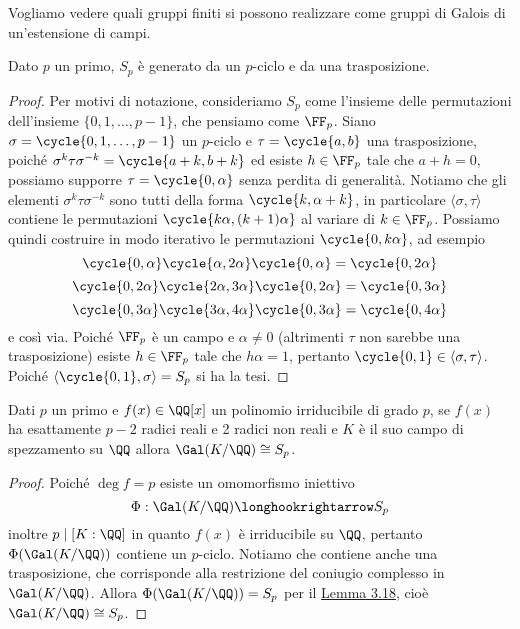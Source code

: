 \documentclass[11pt]{scrartcl}
\begin{document}
	Vogliamo vedere quali gruppi finiti si possono realizzare come gruppi di 
	Galois di un'estensione di campi. 
	
	\begin{lemma}
		\label{lemma3.18}
		Dato $p$ un primo, $S_p$ è generato da un $p$-ciclo e da una trasposizione.
	\end{lemma}
	
	\begin{proof}
		Per motivi di notazione, consideriamo $S_p$ come l'insieme delle permutazioni
		dell'insieme $\{0, 1, \ldots, p - 1\}$, che pensiamo come $\FF_p$. Siano
		$\sigma = \cycle{0, 1, \ldots, p - 1}$ un $p$-ciclo e $\tau = \cycle{a, b}$
		una trasposizione, poiché $\sigma^k\tau\sigma^{-k} = \cycle{a + k, b + k}$
		ed esiste $h \in \FF_p$ tale che $a + h = 0$, possiamo supporre
		$\tau = \cycle{0, \alpha}$ senza perdita di generalità. Notiamo che gli 
		elementi $\sigma^k\tau\sigma^{-k}$ sono tutti della forma $\cycle{k, \alpha + k}$,
		in particolare $\langle\sigma, \tau\rangle$ contiene le permutazioni 
		$\cycle{k\alpha, (k + 1)\alpha}$ al variare di $k \in \FF_p$. Possiamo
		quindi costruire in modo iterativo le permutazioni $\cycle{0, k\alpha}$,
		ad esempio
		\[
		\cycle{0, \alpha}\cycle{\alpha, 2\alpha}\cycle{0, \alpha} = \cycle{0, 2\alpha}
		\]
		\[
		\cycle{0, 2\alpha}\cycle{2\alpha, 3\alpha}\cycle{0, 2\alpha} = \cycle{0, 3\alpha}
		\]
		\[
		\cycle{0, 3\alpha}\cycle{3\alpha, 4\alpha}\cycle{0, 3\alpha} = \cycle{0, 4\alpha}
		\]
		e così via. Poiché $\FF_p$ è un campo e $\alpha \neq 0$ (altrimenti $\tau$ 
		non sarebbe una trasposizione) esiste $h \in \FF_p$ tale che $h\alpha = 1$,
		pertanto $\cycle{0, 1} \in \langle\sigma, \tau\rangle$. Poiché 
		$\langle\cycle{0, 1}, \sigma\rangle = S_p$ si ha la tesi.
	\end{proof}
	
	\begin{lemma}
		\label{lemma3.19}
		Dati $p$ un primo e $f(x) \in \QQ[x]$ un polinomio irriducibile di grado
		$p$, se $f(x)$ ha esattamente $p - 2$ radici reali e 2 radici non reali
		e $K$ è il suo campo di spezzamento su $\QQ$ allora $\Gal(K/\QQ) \cong S_p$.
	\end{lemma}
	
	\begin{proof}
		Poiché $\deg f = p$ esiste un omomorfismo iniettivo 
		\[
		\Phi: \Gal(K/\QQ) \longhookrightarrow S_p
		\]
		inoltre $p \mid [K:\QQ]$ in quanto $f(x)$ è irriducibile su $\QQ$, pertanto 
		$\Phi(\Gal(K/\QQ))$ contiene un $p$-ciclo. Notiamo che contiene anche una
		trasposizione, che corrisponde alla restrizione del coniugio complesso 
		in $\Gal(K/\QQ)$. Allora $\Phi(\Gal(K/\QQ)) = S_p$ per il 
		\hyperref[lemma3.18]{Lemma 3.18}, cioè $\Gal(K/\QQ) \cong S_p$.
	\end{proof}
	
\end{document}
